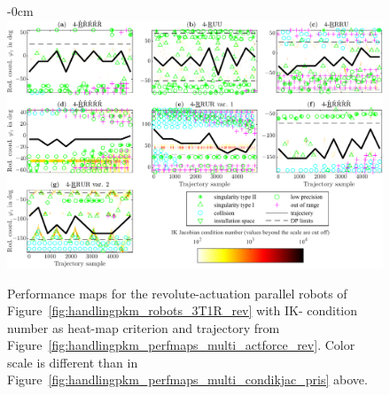 \vspace{-12pt}
\begin{figure}[H]
\begin{adjustwidth}{-\extralength}{0cm}
  \centering
  \includegraphics{Figures/handlingpkm_perfmaps_default_revolute_multi_cond_ikjac_maxactforce.pdf}
\end{adjustwidth}
\caption{Performance
  maps for the revolute-actuation parallel robots of Figure~\ref{fig:handlingpkm_robots_3T1R_rev} with IK- condition number as heat-map criterion and trajectory from Figure~\ref{fig:handlingpkm_perfmaps_multi_actforce_rev}. Color scale is different than in Figure~\ref{fig:handlingpkm_perfmaps_multi_condikjac_pris} above.}
\label{fig:handlingpkm_perfmaps_multi_condikjac_rev}
\end{figure} 
